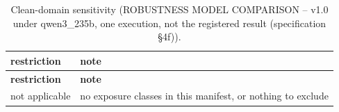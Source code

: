 \begingroup\footnotesize
\begin{longtable}{>{\raggedright\arraybackslash}p{126.4pt}>{\raggedright\arraybackslash}p{304.6pt}}
\caption{Clean-domain sensitivity (ROBUSTNESS MODEL COMPARISON -- v1.0 under qwen3\_\allowbreak{}235b, one execution, not the registered result (specification §4f)).} \\
\toprule
\textbf{restriction} & \textbf{note} \\
\midrule
\endfirsthead
\toprule
\textbf{restriction} & \textbf{note} \\
\midrule
\endhead
\bottomrule
\endfoot
not applicable & no exposure classes in this manifest, or nothing to exclude \\
\end{longtable}
\endgroup
